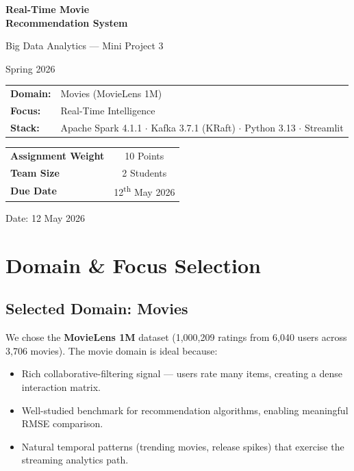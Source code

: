 \documentclass[12pt,a4paper]{article}
\begin{document}
\thispagestyle{empty}
\begin{center}
\vspace*{3cm}

{\Huge\bfseries\color{primary} Real-Time Movie\\[6pt]Recommendation System}

\vspace{1cm}
{\Large Big Data Analytics --- Mini Project 3}

\vspace{0.5cm}
{\large Spring 2026}

\vspace{2cm}

\begin{tabular}{ll}
\textbf{Domain:} & Movies (MovieLens 1M) \\
\textbf{Focus:}  & Real-Time Intelligence \\
\textbf{Stack:}  & Apache Spark 4.1.1 $\cdot$ Kafka 3.7.1 (KRaft) $\cdot$ Python 3.13 $\cdot$ Streamlit \\
\end{tabular}

\vspace{1.5cm}

\begin{tabular}{lc}
\toprule
\textbf{Assignment Weight} & 10 Points \\
\textbf{Team Size} & 2 Students \\
\textbf{Due Date} & 12\textsuperscript{th} May 2026 \\
\bottomrule
\end{tabular}

\vfill
{\small Date: 12 May 2026}
\end{center}
\newpage

\tableofcontents
\newpage

\section{Domain \& Focus Selection}

\subsection{Selected Domain: Movies}
We chose the \textbf{MovieLens 1M} dataset (1,000,209 ratings from 6,040 users across 3,706 movies). The movie domain is ideal because:
\begin{itemize}
  \item Rich collaborative-filtering signal --- users rate many items, creating a dense interaction matrix.
  \item Well-studied benchmark for recommendation algorithms, enabling meaningful RMSE comparison.
  \item Natural temporal patterns (trending movies, release spikes) that exercise the streaming analytics path.
\end{itemize}
\end{document}
